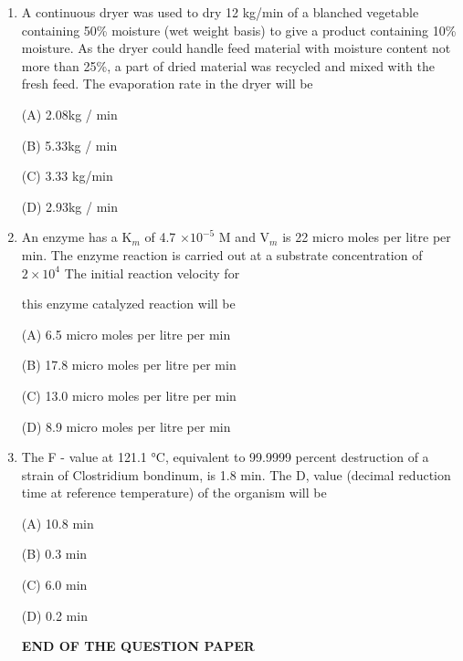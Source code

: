 \documentclass[journal]{IEEEtran}
\begin{document}
\begin{enumerate}
{R. Staining with basic dye

Identify the CORRECT sequence.

(A) QSRP

(C) QPSR

(B) PQRS

(D) RSPQ
}
\item{ A continuous dryer was used to dry 12 kg/min of a blanched vegetable containing 50\% moisture (wet weight basis) to give a product containing 10\% moisture. As the dryer could handle feed material with moisture content not more than 25\%, a part of dried material was recycled and mixed with the fresh feed. The evaporation rate in the dryer will be

(A) 2.08kg / min

(B) 5.33kg / min

(C) 3.33 kg/min

(D) 2.93kg / min
}
\item {An enzyme has a K$_m$ of 4.7 $\times 10 ^{- 5}$ M and V$_m$ is 22 micro moles per litre per min. The enzyme reaction is carried out at a substrate concentration of $2 \times 10^ 4$ The initial reaction velocity for

this enzyme catalyzed reaction will be

(A) 6.5 micro moles per litre per min

(B) 17.8 micro moles per litre per min

(C) 13.0 micro moles per litre per min

(D) 8.9 micro moles per litre per min
}
\item {The F - value at 121.1 °C, equivalent to 99.9999 percent destruction of a strain of Clostridium bondinum, is 1.8 min. The D, value (decimal reduction time at reference temperature) of the organism will be

(A) 10.8 min

(B) 0.3 min

(C) 6.0 min

(D) 0.2 min
}\newline
\begin{center}
\textbf{END OF THE QUESTION PAPER}
\end{center}


\end{enumerate}
\end{document}
